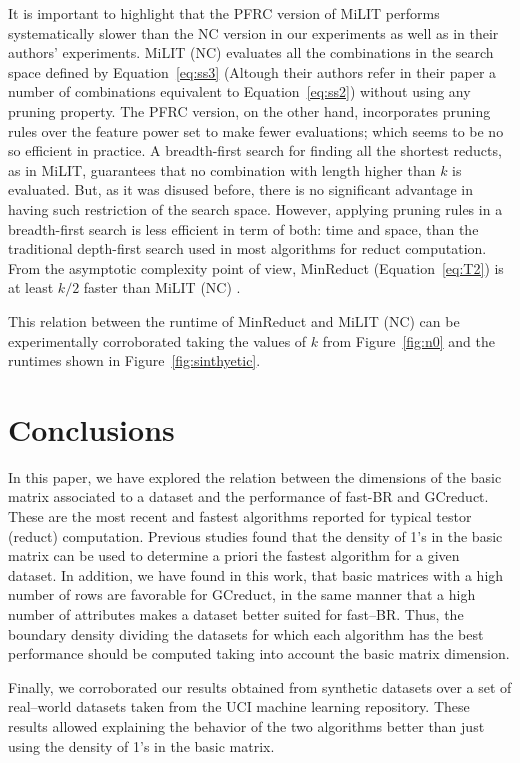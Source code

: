 \documentclass[citenumber]{llncs}
\begin{document}
	It is important to highlight that the PFRC version of MiLIT performs systematically slower than the NC version in our experiments as well as in their authors' experiments.  MiLIT (NC) evaluates all the combinations in the search space defined by Equation~\ref{eq:ss3} (Altough their authors refer in their paper a number of combinations equivalent to Equation~\ref{eq:ss2}) without using any pruning property. The PFRC version, on the other hand, incorporates pruning rules over the feature power set to make fewer evaluations; which seems to be no so efficient in practice. A breadth-first search for finding all the shortest reducts, as in MiLIT, guarantees that no combination with length higher than $k$ is evaluated. But, as it was disused before, there is no significant advantage in having such restriction of the search space. However, applying pruning rules in a breadth-first search is less efficient in term of both: time and space, than the traditional depth-first search used in most algorithms for reduct computation. From the asymptotic complexity point of view, MinReduct (Equation~\ref{eq:T2}) is at least $k/2$ faster than MiLIT (NC) \cite{Piza20}. 
	
	This relation between the runtime of MinReduct and MiLIT (NC) can be experimentally corroborated taking the values of $k$ from Figure~\ref{fig:n0} and the runtimes shown in Figure~\ref{fig:sinthyetic}.
%
\section{Conclusions} \label{conclusions}
%	
	In this paper, we have explored the relation between the dimensions of the basic matrix associated to a dataset and the performance of fast-BR and GCreduct. These are the most recent and fastest algorithms reported for typical testor (reduct) computation. Previous studies found that the density of 1's in the basic matrix can be used to determine a priori the fastest algorithm for a given dataset. In addition, we have found in this work, that basic matrices with a high number of rows are favorable for GCreduct, in the same manner that a high number of attributes makes a dataset better suited for fast--BR. Thus, the boundary density dividing the datasets for which each algorithm has the best performance should be computed taking into account the basic matrix dimension.
	
	Finally, we corroborated our results obtained from synthetic datasets over a set of real--world datasets taken from the UCI machine learning repository. These results allowed explaining the behavior of the two algorithms better than just using the density of 1's in the basic matrix.
	
\end{document}
